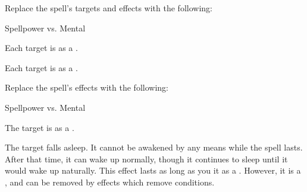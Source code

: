 


Replace the spell's targets and effects with the following:
\begin{spellcontent}

\begin{augmenttargetinginfo}




\end{augmenttargetinginfo}


\begin{augmenteffects}




\begin{spellattack}{Spellpower vs. Mental}


\spellsuccess Each target is \disoriented as a .


\spellcritical Each target is \confused as a .


\end{spellattack}





\end{augmenteffects}

\end{spellcontent}








Replace the spell's effects with the following:
\begin{spellcontent}

\begin{augmenteffects}




\begin{spellattack}{Spellpower vs. Mental}


\spellsuccess The target is \blinded as a .


\spellcritical
The target falls asleep.
It cannot be awakened by any means while the spell lasts.
After that time, it can wake up normally, though it continues to sleep until it would wake up naturally.
This effect lasts as long as you  it as a .
However, it is a , and can be removed by effects which remove conditions.



\end{spellattack}





\end{augmenteffects}

\end{spellcontent}





